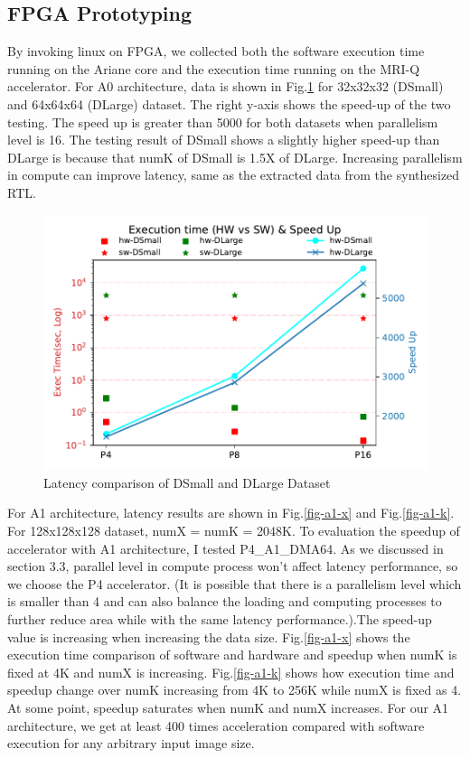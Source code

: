 \subsection{FPGA Prototyping}

By invoking linux on FPGA, we collected both the software execution time running
on the Ariane core and the execution time running on the MRI-Q accelerator. For
A0 architecture, data is shown in Fig.\ref{fig-d32-64} for 32x32x32 (DSmall) and
64x64x64 (DLarge) dataset.  The right y-axis shows the speed-up of the two
testing. The speed up is greater than 5000 for both datasets when parallelism
level is 16. The testing result of DSmall shows a slightly higher speed-up than DLarge
is because that numK of DSmall is 1.5X of DLarge. Increasing parallelism in compute
can improve latency, same as the extracted data from the synthesized RTL.\\

\begin{figure}[h!]
    \centering
    \includegraphics[width=\columnwidth]{figures/a0-both}
    \caption{Latency comparison of DSmall and DLarge Dataset}
    \label{fig-d32-64}
\end{figure}

For A1 architecture, latency results are shown in Fig.\ref{fig-a1-x} and
Fig.\ref{fig-a1-k}. For 128x128x128 dataset, numX = numK = 2048K. To evaluation
the speedup of accelerator with A1 architecture, I tested P4\_A1\_DMA64. As we
discussed in section 3.3, parallel level in compute process won't affect latency
performance, so we choose the P4 accelerator. (It is possible that there is a
parallelism level which is smaller than 4 and can also balance the loading and
computing processes to further reduce area while with the same latency
performance.).The speed-up value is increasing when increasing the data
size. Fig.\ref{fig-a1-x} shows the execution time comparison of software and
hardware and speedup when numK is fixed at 4K and numX is
increasing. Fig.\ref{fig-a1-k} shows how execution time and speedup change over
numK increasing from 4K to 256K while numX is fixed as 4.  At some point,
speedup saturates when numK and numX increases. For our A1 architecture, we get
at least 400 times acceleration compared with software execution for any
arbitrary input image size.\\

